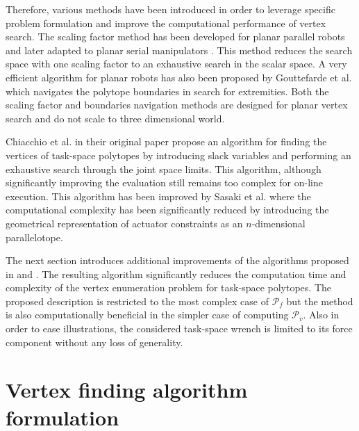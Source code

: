 Therefore, various methods have been introduced in order to leverage specific problem formulation and improve the computational performance of vertex search. The scaling factor method has been developed for planar parallel robots \cite{nokleby_force_2005} and later adapted to planar serial manipulators \cite{julio_frantz_analysis_2015}. This method reduces the search space with one scaling factor to an exhaustive search in the scalar space. A very efficient algorithm for planar robots has also been proposed by Gouttefarde et al. \cite{gouttefarde_versatile_2015} which navigates the polytope boundaries in search for extremities. Both the scaling factor and boundaries navigation methods are designed for planar vertex search and do not scale to three dimensional world.

Chiacchio et al. in their original paper \cite{chiacchio_evaluation_1996} propose an algorithm for finding the vertices of task-space polytopes by introducing slack variables and performing an exhaustive search through the joint space limits. This algorithm, although significantly improving the evaluation still remains too complex for on-line execution. This algorithm has been improved by Sasaki et al. \cite{sasaki_vertex_nodate} where the computational complexity has been significantly reduced by introducing the geometrical representation of actuator constraints as an $n$-dimensional parallelotope.

The next section introduces additional improvements of the algorithms proposed in \cite{chiacchio_evaluation_1996} and \cite{sasaki_vertex_nodate}. The resulting algorithm significantly reduces the computation time and complexity of the vertex enumeration problem for task-space polytopes. The proposed description is restricted to the most complex case of $\mathcal{P}_f$ but the method is also computationally beneficial in the simpler case of computing $\mathcal{P}_v$. Also in order to ease illustrations, the considered task-space wrench is limited to its force component without any loss of generality.

\section{Vertex finding algorithm formulation}
\label{sec:algorithm}

